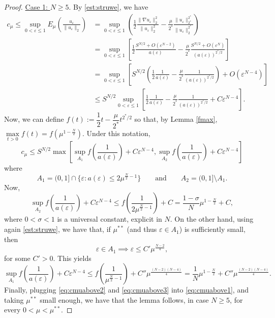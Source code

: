 \documentclass[10pt]{article}
\newcommand{\eps}{\varepsilon}
\theoremstyle{definition}
\numberwithin{equation}{section}
\begin{document}
\begin{proof}
\underline{Case 1: $N\geq5$}. By \eqref{est:struwe}, we have
\begin{equation*}
    \begin{aligned}\displaystyle
 c_{\mu}\leq \sup\limits_{0<\varepsilon\le 1}E_{\mu}\left(\frac{u_{\varepsilon}}{\|u_{\varepsilon}\|_{2}}\right)&=\sup\limits_{0<\varepsilon\le 1}\left(\frac{1}{2}\frac{\|\nabla u_{\varepsilon}\|^{2}_{2}}{\| u_{\varepsilon}\|^{2}_{2}}-\frac{\mu}{2^{*}}\frac{\| u_{\varepsilon}\|^{2^{*}}_{2^{*}}}{\| u_{\varepsilon}\|^{2^{*}}_{2}}\right)\\
 &=\sup\limits_{0<\varepsilon\le 1}\left[\frac{1}{2}\frac{S^{N/2}+O(\varepsilon^{N-2})}{a(\varepsilon)}-\frac{\mu}{2^{*}}\frac{S^{N/2}+O(\varepsilon^{N})}{(a(\varepsilon))^{2^{*}/2}}\right]\\
 &=\sup\limits_{0<\varepsilon\le 1}\left[S^{N/2}\left(\frac{1}{2}\frac{1}{a(\varepsilon)}-\frac{\mu}{2^{*}}\frac{1}{(a(\varepsilon))^{2^{*}/2}}\right)+O(\varepsilon^{N-4})\right]\\
 &\leq S^{N/2} \sup\limits_{0<\varepsilon\le 1}\left[\frac{1}{2}\frac{1}{a(\varepsilon)}-\frac{\mu}{2^{*}}\frac{1}{(a(\varepsilon))^{2^{*}/2}}+C\varepsilon^{N-4}\right].
    \end{aligned}
\end{equation*}
Now, we can define $f(t):=\dfrac{1}{2}t-\dfrac{\mu}{2^{*}}t^{2^{*}/2}$ so that, by Lemma \ref{fmax}, $\max\limits_{t>0} f(t)=f(\mu^{1-\frac{N}{2}})$. Under this notation,
\begin{equation}\label{eq:cmuabove1}
c_{\mu}\leq S^{N/2}  \max\left[ \sup\limits_{A_1}f\left(\frac{1}{a(\varepsilon)}\right)+ C\eps^{N-4},\sup\limits_{A_2}f\left(\frac{1}{a(\varepsilon)}\right)+ C\eps^{N-4}\right]
\end{equation}
where
\[
A_1 = (0,1] \cap \{\eps:a(\eps)\le 2\mu^{\frac{N}{2}-1}\}
\qquad \text{and} \qquad
A_2 = (0,1] \setminus A_1.
\]
Now,
\begin{equation}\label{eq:cmuabove2}
\sup\limits_{A_2}f\left(\frac{1}{a(\varepsilon)}\right)+ C\eps^{N-4} \le
f\left(\frac{1}{2\mu^{\frac{N}{2}-1}}\right) + C = \frac{1-\sigma}{N}\mu^{1-\frac{N}{2}} + C,
\end{equation}
where $0<\sigma<1$ is a universal constant, explicit in $N$. On the other hand, using
again \eqref{est:struwe}, we have that, if $\mu^{**}$ (and thus $\eps\in A_1$) is sufficiently small,
then
\[
\eps \in A_1 \implies \eps \le C'\mu^{\frac{N-2}{4}},
\]
for some $C'>0$. This yields
\begin{equation}\label{eq:cmuabove3}
\sup\limits_{A_1}f\left(\frac{1}{a(\varepsilon)}\right)+ C\eps^{N-4} \le
f\left(\frac{1}{\mu^{\frac{N}{2}-1}}\right) + C'' \mu^{\frac{(N-2)(N-4)}{4}} =
 \frac{1}{N}\mu^{1-\frac{N}{2}} + C'' \mu^{\frac{(N-2)(N-4)}{4}}.
\end{equation}
Finally, plugging \eqref{eq:cmuabove2} and \eqref{eq:cmuabove3} into \eqref{eq:cmuabove1}, and taking
$\mu^{**}$ small enough, we have that the lemma follows, in case $N\ge5$, for every $0<\mu<\mu^{**}$.


\end{proof}
\end{document}
